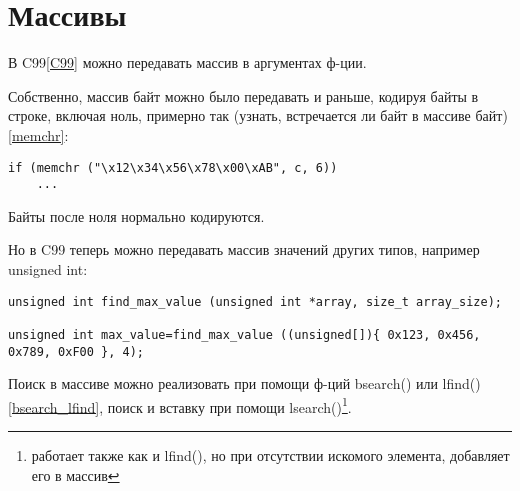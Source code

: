 ﻿\section{Массивы}

В C99\ref{C99} можно передавать массив в аргументах ф-ции.

Собственно, массив байт можно было передавать и раньше, кодируя байты в строке, включая ноль, примерно так
(узнать, встречается ли байт  в массиве байт)\ref{memchr}:

\begin{lstlisting}
if (memchr ("\x12\x34\x56\x78\x00\xAB", c, 6))
	...
\end{lstlisting}

Байты после ноля нормально кодируются.

Но в C99 теперь можно передавать массив значений других типов, например unsigned int:

\begin{lstlisting}
unsigned int find_max_value (unsigned int *array, size_t array_size);

unsigned int max_value=find_max_value ((unsigned[]){ 0x123, 0x456, 0x789, 0xF00 }, 4);
\end{lstlisting}

Поиск в массиве можно реализовать при помощи ф-ций bsearch() или lfind()\ref{bsearch_lfind}, 
поиск и вставку при помощи lsearch()\footnote{работает также как и lfind(), но при отсутствии искомого элемента,
добавляет его в массив}.

